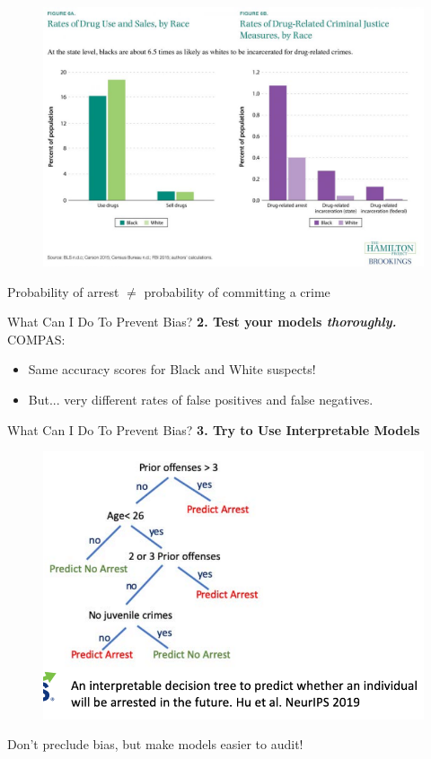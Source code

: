 \documentclass[11pt]{beamer}
\begin{document}
\begin{frame}[c]{}
  \begin{figure}
    \centering
    \includegraphics[width=\textwidth]{images/drug_use_versus_arrest.jpg}
  \end{figure}
  Probability of arrest $\neq$ probability of committing a crime
\end{frame}

\begin{frame}[c]{What Can I Do To Prevent Bias?}
\textbf{2. Test your models \emph{thoroughly.}} \\
COMPAS:
\begin{itemize}
  \item Same accuracy scores for Black and White suspects!
  \pause \item But... very different rates of false positives and false negatives.
\end{itemize}
\end{frame}

\begin{frame}[c]{What Can I Do To Prevent Bias?}
\textbf{3. Try to Use Interpretable Models}
\begin{figure}
  \centering
\pause \includegraphics[width=\textwidth]{images/rudin_model_compas.png}
\end{figure}
\pause Don't preclude bias, but make models easier to audit!
\end{frame}
\end{document}
